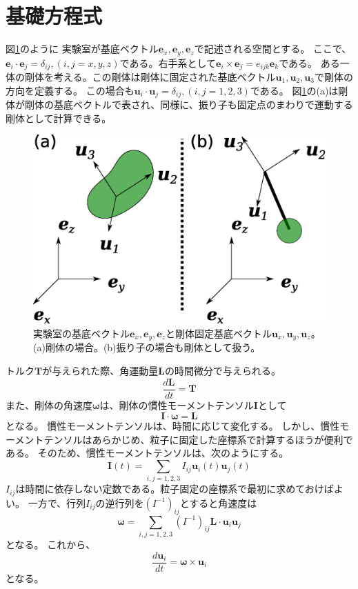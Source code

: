 \documentclass[a4paper,11pt]{jbook}
\begin{document}
\section{基礎方程式}
図\ref{fig:3_01_system}のように
実験室が基底ベクトル$\bm{e}_x, \bm{e}_y,\bm{e}_z $で記述される空間とする。
ここで、$\bm{e}_i\cdot\bm{e}_j=\delta_{ij}, (i,j=x,y,z)$である。右手系として$\bm{e}_i\times\bm{e}_j=e_{ijk}\bm{e}_k$である。
ある一体の剛体を考える。この剛体は剛体に固定された基底ベクトル$\bm{u}_1,\bm{u}_2,\bm{u}_3$で剛体の方向を定義する。
この場合も$\bm{u}_i\cdot\bm{u}_j=\delta_{ij}, (i,j=1,2,3)$である。
図\ref{fig:3_01_system}の(a)は剛体が剛体の基底ベクトルで表され、同様に、振り子も固定点のまわりで運動する剛体として計算できる。
\begin{figure}[h]
\centering
  \includegraphics[clip,width=0.8\linewidth]{pict/3_01_system.eps}
  \caption{実験室の基底ベクトル$\bm{e}_x,\bm{e}_y,\bm{e}_z$と剛体固定基底ベクトル$\bm{u}_x,\bm{u}_y,\bm{u}_z$。
  (a)剛体の場合。(b)振り子の場合も剛体として扱う。
  }
  \label{fig:3_01_system}
\end{figure}

トルク$\bm{T}$が与えられた際、角運動量$\bm{L}$の時間微分で与えられる。
\begin{equation}
\frac{d\bm{L}}{dt}=\bm{T}
\label{eq:dLdt}
\end{equation}
また、剛体の角速度$\bm{\omega}$は、剛体の慣性モーメントテンソル$\bm{I}$として
\begin{equation}
\bm{I}\cdot\bm{\omega}=\bm{L}
\end{equation}
となる。
慣性モーメントテンソルは、時間に応じて変化する。
しかし、慣性モーメントテンソルはあらかじめ、粒子に固定した座標系で計算するほうが便利である。
そのため、慣性モーメントテンソルは、次のようにする。
\begin{equation}
\bm{I}(t)=\sum_{i,j=1,2,3}I_{ij}\bm{u}_i(t)\bm{u}_j(t)
\end{equation}
$I_{ij}$は時間に依存しない定数である。粒子固定の座標系で最初に求めておけばよい。
一方で、行列$I_{ij}$の逆行列を$(I^{-1})_{ij}$とすると角速度は
 \begin{equation}
 \bm{\omega}=\sum_{i,j=1,2,3}(I^{-1})_{ij}\bm{L}\cdot\bm{u}_i\bm{u}_j
 \label{eq:omega}
 \end{equation}
 となる。
 これから、
\begin{equation}
\frac{d\bm{u}_i}{dt}=\bm{\omega}\times\bm{u}_i
\label{eq:dudt}
\end{equation}
となる。
\end{document}
